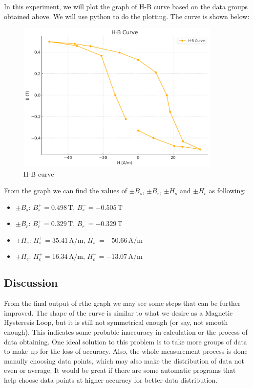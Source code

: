 \documentclass[12pt, a4paper, oneside]{article}
\begin{document}
In this experiment, we will plot the graph of H-B curve based on the data groups obtained above. We will use python to do the plotting. The 
curve is shown below:

\begin{figure}[htbp]
	\centering
	\includegraphics[width=0.9\textwidth]{fig3.png}
	\caption{H-B curve}
	\label{fig3}
\end{figure}

From the graph we can find the values of $\pm B_s$, $\pm B_r$, $\pm H_s$ and $\pm H_c$ as following:
\begin{itemize}
    \item $\pm B_s$: $B_s^+ = 0.498 \, \text{T}$, $B_s^- = -0.505 \, \text{T}$
    \item $\pm B_r$: $B_r^+ = 0.329 \, \text{T}$, $B_r^- = -0.329 \, \text{T}$
    \item $\pm H_s$: $H_s^+ = 35.41 \, \text{A/m}$, $H_s^- = -50.66 \, \text{A/m}$
    \item $\pm H_c$: $H_c^+ = 16.34 \, \text{A/m}$, $H_c^- = -13.07 \, \text{A/m}$
\end{itemize}

\subsection{Discussion}
\indent

From the final output of rthe graph we may see some steps that can be further improved. The shape of the curve is similar to what we desire as 
a Magnetic Hysteresis Loop, but it is still not symmetrical enough (or say, not smooth enough). This indicates some probable inaccuracy
in calculation or the process of data obtaining. One ideal solution to this problem is to take more groups of data to make up for the loss of accuracy.
Also, the whole measurement process is done manully choosing data points, which may also make the distribution of data not even or average. It would 
be great if there are some automatic programs that help choose data points at higher accuracy for better data distribution. 
\end{document}
